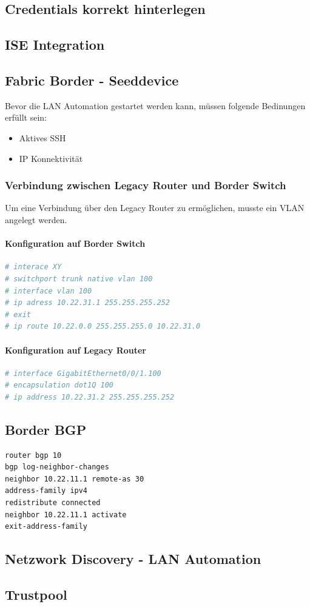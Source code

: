 \subsection{Credentials korrekt hinterlegen}


\subsection{ISE Integration}

\subsection{Fabric Border - Seeddevice}
Bevor die LAN Automation gestartet werden kann, müssen folgende Bedinungen erfüllt sein:
\begin{itemize}
	\item Aktives SSH
	\item IP Konnektivität
\end{itemize}

\subsubsection{Verbindung zwischen Legacy Router und Border Switch}
Um eine Verbindung über den Legacy Router zu ermöglichen, musste ein VLAN angelegt werden.

\paragraph{Konfiguration auf Border Switch}
\begin{lstlisting}[language=bash]
# interace XY
# switchport trunk native vlan 100
# interface vlan 100
# ip adress 10.22.31.1 255.255.255.252
# exit
# ip route 10.22.0.0 255.255.255.0 10.22.31.0
\end{lstlisting}

\paragraph{Konfiguration auf Legacy Router}
\begin{lstlisting}[language=bash]
# interface GigabitEthernet0/0/1.100
# encapsulation dot1Q 100
# ip address 10.22.31.2 255.255.255.252
\end{lstlisting}

\subsection{Border BGP}
\begin{lstlisting}[language=bash]
router bgp 10
bgp log-neighbor-changes
neighbor 10.22.11.1 remote-as 30
address-family ipv4
redistribute connected
neighbor 10.22.11.1 activate
exit-address-family
\end{lstlisting}


\subsection{Netzwork Discovery - LAN Automation}

\subsection{Trustpool}
